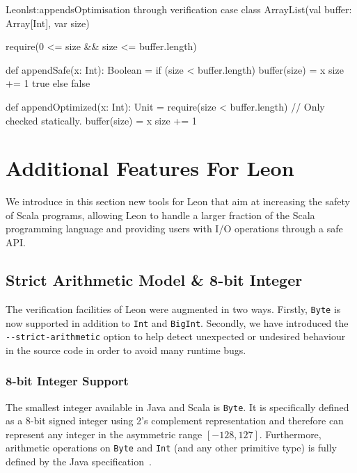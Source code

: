 \documentclass[a4paper,twoside]{article}
\newcommand{\Inline}[1]{\lstinline[basicstyle=\ttfamily]|#1|}
\newcommand{\InlineS}[1]{\lstinline[language=Leon]|#1|}
\let\oldsection\section
\renewcommand\section{\cleardoublepage\oldsection}
\begin{document}
\begin{Code}{Leon}{lst:appends}{Optimisation through verification}
case class ArrayList(val buffer: Array[Int], var size) {
  require(0 <= size && size <= buffer.length)

  def appendSafe(x: Int): Boolean = {
    if (size < buffer.length) {
      buffer(size) = x
      size += 1
      true
    } else false
  }

  def appendOptimized(x: Int): Unit = {
    require(size < buffer.length) // Only checked statically.
    buffer(size) = x
    size += 1
  }
}
\end{Code}


\section{Additional Features For Leon}
\label{leon_features}


We introduce in this section new tools for Leon that aim at increasing the
safety of Scala programs, allowing Leon to handle a larger fraction of the Scala
programming language and providing users with I/O operations through a safe API.

\subsection{Strict Arithmetic Model \& 8-bit Integer}



The verification facilities of Leon were augmented in two ways. Firstly,
\InlineS{Byte} is now supported in addition to \InlineS{Int} and
\InlineS{BigInt}. Secondly, we have introduced the \Inline{--strict-arithmetic}
option to help detect unexpected or undesired behaviour in the source code in
order to avoid many runtime bugs.

\subsubsection*{8-bit Integer Support}

The smallest integer available in Java and Scala is \InlineS{Byte}. It is
specifically defined as a 8-bit signed integer using 2's complement
representation and therefore can represent any integer in the asymmetric range
$[-128,127]$. Furthermore, arithmetic operations on \InlineS{Byte} and
\InlineS{Int} (and any other primitive type) is fully defined by the Java
specification~\cite{java8}.
\end{document}

